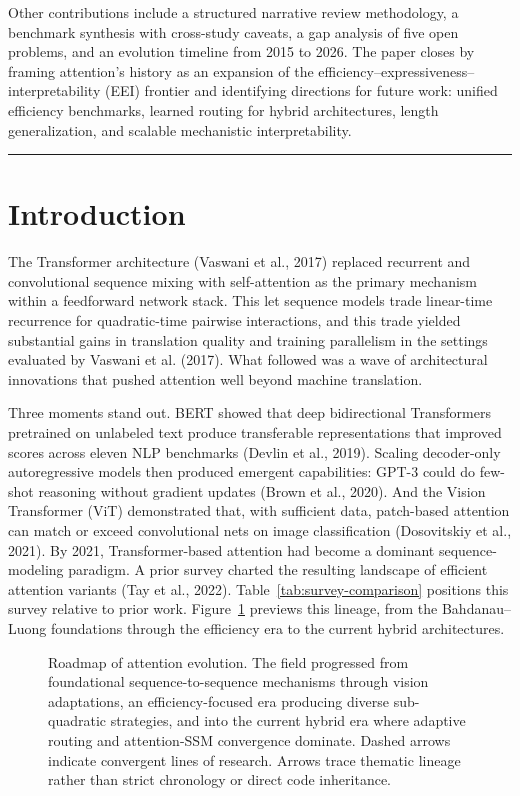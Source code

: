 \documentclass[10pt,twocolumn]{article}
\newif\ifshrinkfloats
\begin{document}
Other contributions include a structured narrative review methodology, a benchmark synthesis with cross-study caveats, a gap analysis of five open problems, and an evolution timeline from 2015 to 2026. The paper closes by framing attention's history as an expansion of the efficiency--expressiveness--interpretability (EEI) frontier and identifying directions for future work: unified efficiency benchmarks, learned routing for hybrid architectures, length generalization, and scalable mechanistic interpretability.

\begin{center}\rule{0.5\linewidth}{0.5pt}\end{center}

\section{Introduction}\label{introduction}

The Transformer architecture (Vaswani et al., 2017) replaced recurrent and convolutional sequence mixing with self-attention as the primary mechanism within a feedforward network stack. This let sequence models trade linear-time recurrence for quadratic-time pairwise interactions, and this trade yielded substantial gains in translation quality and training parallelism in the settings evaluated by Vaswani et al. (2017). What followed was a wave of architectural innovations that pushed attention well beyond machine translation.

Three moments stand out. BERT showed that deep bidirectional Transformers pretrained on unlabeled text produce transferable representations that improved scores across eleven NLP benchmarks (Devlin et al., 2019). Scaling decoder-only autoregressive models then produced emergent capabilities: GPT-3 could do few-shot reasoning without gradient updates (Brown et al., 2020). And the Vision Transformer (ViT) demonstrated that, with sufficient data, patch-based attention can match or exceed convolutional nets on image classification (Dosovitskiy et al., 2021). By 2021, Transformer-based attention had become a dominant sequence-modeling paradigm. A prior survey charted the resulting landscape of efficient attention variants (Tay et al., 2022). Table~\ref{tab:survey-comparison} positions this survey relative to prior work. Figure~\ref{fig:roadmap} previews this lineage, from the Bahdanau--Luong foundations through the efficiency era to the current hybrid architectures.

\begin{figure}[!t]
\centering
\resizebox{\ifshrinkfloats 0.87\textwidth\else 0.9\textwidth\fi}{!}{}
\caption{Roadmap of attention evolution. The field progressed from foundational sequence-to-sequence mechanisms through vision adaptations, an efficiency-focused era producing diverse sub-quadratic strategies, and into the current hybrid era where adaptive routing and attention-SSM convergence dominate. Dashed arrows indicate convergent lines of research. Arrows trace thematic lineage rather than strict chronology or direct code inheritance.}
\label{fig:roadmap}
\end{figure}
\end{document}

